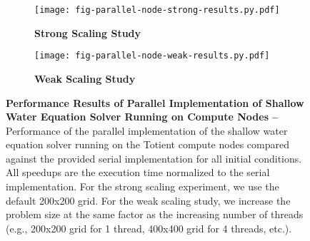 
\begin{figure}[h]

  \begin{minipage}[t]{0.48\tw}
  \begin{subfigure}{\tw}

  \centering
  \texttt{[image: fig-parallel-node-strong-results.py.pdf]}
  \caption{\textbf{Strong Scaling Study}}
  \label{fig-parallel-node-strong-results}

  \end{subfigure}
  \end{minipage}%
  \hfill%
  \begin{minipage}[t]{0.48\tw}
  \begin{subfigure}{\tw}

  \centering
  \texttt{[image: fig-parallel-node-weak-results.py.pdf]}
  \caption{\textbf{Weak Scaling Study}}
  \label{fig-parallel-node-weak-results}

  \end{subfigure}
  \end{minipage}%

  \caption{\textbf{Performance Results of Parallel Implementation of
      Shallow Water Equation Solver Running on Compute Nodes --}
    Performance of the parallel implementation of the shallow water
    equation solver running on the Totient compute nodes compared against
    the provided serial implementation for all initial conditions. All
    speedups are the execution time normalized to the serial
    implementation. For the strong scaling experiment, we use the default
    200x200 grid.  For the weak scaling study, we increase the problem
    size at the same factor as the increasing number of threads (e.g.,
    200x200 grid for 1 thread, 400x400 grid for 4 threads, etc.). }

  \label{fig-parallel-node-results}

\end{figure}

